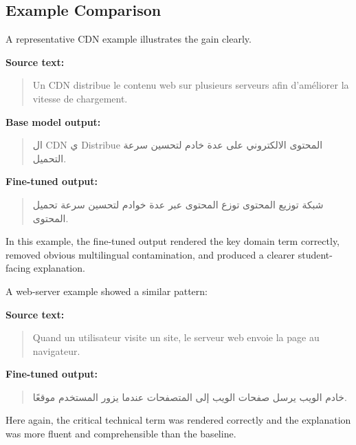 \documentclass[education,article,submit,moreauthors]{Definitions/mdpi}
\begin{document}
\subsection{Example Comparison}

A representative CDN example illustrates the gain clearly.

\textbf{Source text:}

\begin{quote}
Un CDN distribue le contenu web sur plusieurs serveurs afin d’améliorer la vitesse de chargement.
\end{quote}

\textbf{Base model output:}

\begin{quote}
\textarabic{ال \textenglish{CDN} ي \textenglish{Distribue} المحتوى الالكتروني على عدة خادم لتحسين سرعة التحميل.}
\end{quote}

\textbf{Fine-tuned output:}

\begin{quote}
\textarabic{شبكة توزيع المحتوى توزع المحتوى عبر عدة خوادم لتحسين سرعة تحميل المحتوى.}
\end{quote}

In this example, the fine-tuned output rendered the key domain term correctly, removed obvious multilingual contamination, and produced a clearer student-facing explanation.

A web-server example showed a similar pattern:

\textbf{Source text:}

\begin{quote}
Quand un utilisateur visite un site, le serveur web envoie la page au navigateur.
\end{quote}

\textbf{Fine-tuned output:}

\begin{quote}
\textarabic{خادم الويب يرسل صفحات الويب إلى المتصفحات عندما يزور المستخدم موقعًا.}
\end{quote}

Here again, the critical technical term was rendered correctly and the explanation was more fluent and comprehensible than the baseline.
\end{document}
